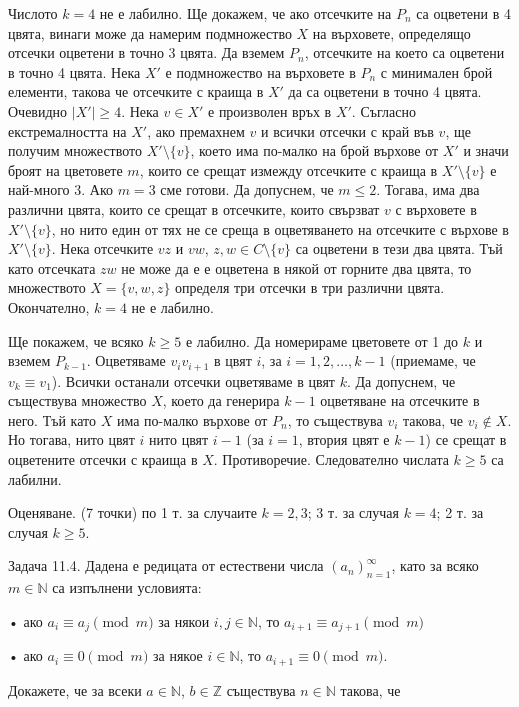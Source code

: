 Числото $k=4$ не е лабилно. Ще докажем, че ако отсечките на $P_n$ са оцветени в 4 цвята, винаги може да намерим подмножество $X$ на върховете, определящо отсечки оцветени в точно 3 цвята. Да вземем $P_n$, отсечките на което са оцветени в точно 4 цвята. Нека $X'$ е подмножество на върховете в $P_n$ с минимален брой елементи, такова че отсечките с краища в $X'$ да са оцветени в точно 4 цвята. Очевидно $|X'|\ge4$. Нека $v\in X'$ е произволен връх в $X'$. Съгласно екстремалността на $X'$, ако премахнем $v$ и всички отсечки с край във $v$, ще получим множеството $X'\setminus\{v\}$, което има по-малко на брой върхове от $X'$ и значи броят на цветовете $m$, които се срещат измежду отсечките с краища в $X'\setminus\{v\}$ е най-много 3. Ако $m=3$ сме готови. Да допуснем, че $m\le2$. Тогава, има два различни цвята, които се срещат в отсечките, които свързват $v$ с върховете в $X'\setminus\{v\}$, но нито един от тях не се среща в оцветяването на отсечките с върхове в $X'\setminus\{v\}$. Нека отсечките $vz$ и $vw$, $z,w\in C\setminus\{v\}$ са оцветени в тези два цвята. Тъй като отсечката $zw$ не може да е е оцветена в някой от горните два цвята, то множеството $X=\{v,w,z\}$ определя три отсечки в три различни цвята. Окончателно, $k=4$ не е лабилно.

Ще покажем, че всяко $k\ge5$ е лабилно. Да номерираме цветовете от 1 до $k$ и вземем $P_{k-1}$. Оцветяваме $v_iv_{i+1}$ в цвят $i$, за $i=1,2,\ldots,k-1$ (приемаме, че $v_k\equiv v_1$). Всички останали отсечки оцветяваме в цвят $k$. Да допуснем, че съществува множество $X$, което да генерира $k-1$ оцветяване на отсечките в него. Тъй като $X$ има по-малко върхове от $P_n$, то съществува $v_i$ такова, че $v_i\notin X$. Но тогава, нито цвят $i$ нито цвят $i-1$ (за $i=1$, втория цвят е $k-1$) се срещат в оцветените отсечки с краища в $X$. Противоречие. Следователно числата $k\ge5$ са лабилни.

Оценяване. (7 точки) по 1 т. за случаите $k=2,3$; 3 т. за случая $k=4$; 2 т. за случая $k\ge5$.

Задача 11.4. Дадена е редицата от естествени числа $(a_n)_{n=1}^{\infty}$, като за всяко $m\in\mathbb N$ са изпълнени условията:

• ако $a_i\equiv a_j\pmod m$ за някои $i,j\in\mathbb N$, то $a_{i+1}\equiv a_{j+1}\pmod m$

• ако $a_i\equiv0\pmod m$ за някое $i\in\mathbb N$, то $a_{i+1}\equiv0\pmod m$.

Докажете, че за всеки $a\in\mathbb N$, $b\in\mathbb Z$ съществува $n\in\mathbb N$ такова, че

